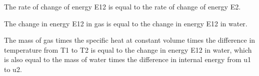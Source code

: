 The rate of change of energy E12 is equal to the rate of change of energy E2.

The change in energy E12 in gas is equal to the change in energy E12 in water.

The mass of gas times the specific heat at constant volume times the difference in temperature from T1 to T2 is equal to the change in energy E12 in water, which is also equal to the mass of water times the difference in internal energy from u1 to u2.